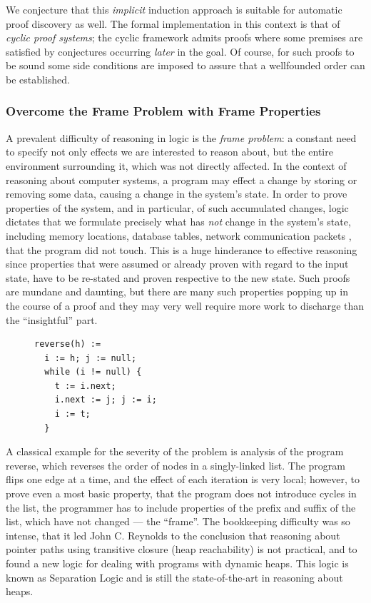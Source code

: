 {\color{gray}We conjecture that this \emph{implicit} induction approach is suitable for
automatic proof discovery as well.
The formal implementation in this context is that of \emph{cyclic proof systems};
the cyclic framework admits proofs where some premises are satisfied by
conjectures occurring \emph{later} in the goal.
Of course, for such proofs to be sound some side conditions are imposed to assure
that a wellfounded order can be established.
}

\subsubsection{Overcome the Frame Problem with Frame Properties}

A prevalent difficulty of reasoning in logic is the \emph{frame problem}:
a constant need to specify not only effects we are interested to reason about,
but the entire environment surrounding it, which was not directly affected.
In the context of reasoning about computer systems, a program may effect a change
by storing or removing some data, causing a change in the system's state.
In order to prove properties of the system, and in particular, of such
accumulated changes, logic dictates that we formulate precisely what has
\emph{not} change in the system's state, including memory locations, database
tables, network communication packets \etc, that the program did not touch.
This is a huge hinderance to effective reasoning since properties that were
assumed or already proven with regard to the input state, have to be
re-stated and proven respective to the new state.
Such proofs are mundane and daunting, but there are many such properties
popping up in the course of a proof and they may very well require more work to
discharge than the ``insightful'' part.

\begin{figure} 
\begin{lstlisting}[basicstyle=\linespread{1.36}\ttfamily\fontsize{10pt}{8pt}\selectfont]
reverse(h) :=
  i := h; j := null;
  while (i != null) {
    t := i.next;
    i.next := j; j := i;
    i := t;
  }
\end{lstlisting}
\end{figure}

A classical example for the severity of the problem is analysis of the program
\textsf{reverse}, which reverses the order of nodes in a singly-linked list.
The program flips one edge at a time, and the effect of each iteration is
very local; however, to prove even a most basic property, that the program does
not introduce cycles in the list, the programmer has to include properties of
the prefix and suffix of the list, which have not changed --- the ``frame''.
The bookkeeping difficulty was so intense, that it led John C. Reynolds to the
conclusion that reasoning about pointer paths using transitive closure (heap
reachability) is not practical, and to found a new logic for dealing with
programs with dynamic heaps.
This logic is known as Separation Logic and is still the state-of-the-art in
reasoning about heaps.

